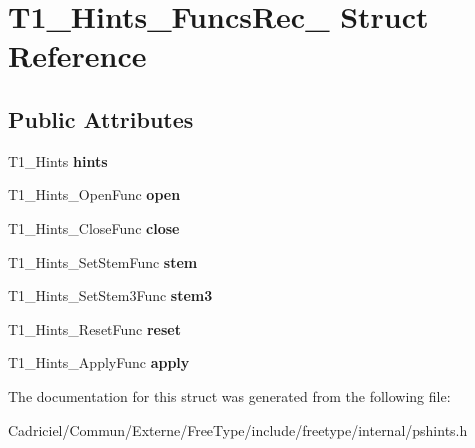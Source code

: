 \hypertarget{struct_t1___hints___funcs_rec__}{}\section{T1\+\_\+\+Hints\+\_\+\+Funcs\+Rec\+\_\+ Struct Reference}
\label{struct_t1___hints___funcs_rec__}
\subsection*{Public Attributes}
\begin{DoxyCompactItemize}
\item 
T1\+\_\+\+Hints {\bfseries hints}\hypertarget{struct_t1___hints___funcs_rec___a6a58f489e362b746703b4caae91349ef}{}\label{struct_t1___hints___funcs_rec___a6a58f489e362b746703b4caae91349ef}

\item 
T1\+\_\+\+Hints\+\_\+\+Open\+Func {\bfseries open}\hypertarget{struct_t1___hints___funcs_rec___a41ca09a042c8e92f64822f19486a622a}{}\label{struct_t1___hints___funcs_rec___a41ca09a042c8e92f64822f19486a622a}

\item 
T1\+\_\+\+Hints\+\_\+\+Close\+Func {\bfseries close}\hypertarget{struct_t1___hints___funcs_rec___aa6d879215bff42f4b3851a9151c78505}{}\label{struct_t1___hints___funcs_rec___aa6d879215bff42f4b3851a9151c78505}

\item 
T1\+\_\+\+Hints\+\_\+\+Set\+Stem\+Func {\bfseries stem}\hypertarget{struct_t1___hints___funcs_rec___abdbf955a1fc9b19799ed8ea8137c9381}{}\label{struct_t1___hints___funcs_rec___abdbf955a1fc9b19799ed8ea8137c9381}

\item 
T1\+\_\+\+Hints\+\_\+\+Set\+Stem3\+Func {\bfseries stem3}\hypertarget{struct_t1___hints___funcs_rec___acc1edae831d279929f93c8eb1872daa3}{}\label{struct_t1___hints___funcs_rec___acc1edae831d279929f93c8eb1872daa3}

\item 
T1\+\_\+\+Hints\+\_\+\+Reset\+Func {\bfseries reset}\hypertarget{struct_t1___hints___funcs_rec___a5646878cdabd593389e28cffd8b077cb}{}\label{struct_t1___hints___funcs_rec___a5646878cdabd593389e28cffd8b077cb}

\item 
T1\+\_\+\+Hints\+\_\+\+Apply\+Func {\bfseries apply}\hypertarget{struct_t1___hints___funcs_rec___a3fb5f01de31da9efb2ae8f5251b4d506}{}\label{struct_t1___hints___funcs_rec___a3fb5f01de31da9efb2ae8f5251b4d506}

\end{DoxyCompactItemize}


The documentation for this struct was generated from the following file\+:\begin{DoxyCompactItemize}
\item 
Cadriciel/\+Commun/\+Externe/\+Free\+Type/include/freetype/internal/pshints.\+h\end{DoxyCompactItemize}
